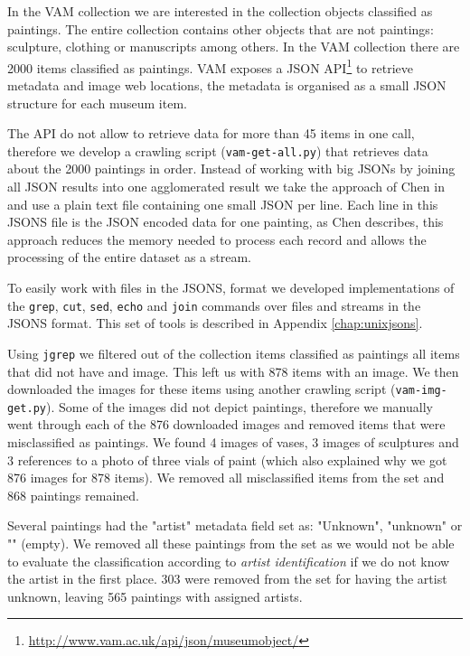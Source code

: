 \documentclass[11pt,a4paper,twoside,openright]{report}
\begin{document}
In the VAM collection we are interested in the collection objects classified as
paintings.  The entire collection contains other objects that are not
paintings: sculpture, clothing or manuscripts among others.  In the VAM
collection there are 2000 items classified as paintings.  VAM exposes a JSON
API\footnote{\href{http://www.vam.ac.uk/api/json/museumobject/}
{http://www.vam.ac.uk/api/json/museumobject/}} to retrieve metadata and image
web locations, the metadata is organised as a small JSON structure for each
museum item.

The API do not allow to retrieve data for more than 45 items in one call,
therefore we develop a crawling script (\texttt{vam-get-all.py}) that retrieves
data about the 2000 paintings in order.  Instead of working with big JSONs by
joining all JSON results into one agglomerated result we take the approach of
Chen in \cite{chen09yahoo} and use a plain text file containing one small JSON
per line.  Each line in this JSONS file is the JSON encoded data for one
painting, as Chen \cite{chen09yahoo} describes, this approach reduces the
memory needed to process each record and allows the processing of the entire
dataset as a stream.

To easily work with files in the JSONS, format we developed implementations of
the \texttt{grep}, \texttt{cut}, \texttt{sed}, \texttt{echo} and \texttt{join}
commands over files and streams in the JSONS format.  This set of tools is
described in Appendix \ref{chap:unixjsons}.

Using \texttt{jgrep} we filtered out of the collection items classified as
paintings all items that did not have and image.  This left us with 878 items
with an image.  We then downloaded the images for these items using another
crawling script (\texttt{vam-img-get.py}).  Some of the images did not depict
paintings, therefore we manually went through each of the 876 downloaded images
and removed items that were misclassified as paintings.  We found 4 images of
vases, 3 images of sculptures and 3 references to a photo of three vials of
paint (which also explained why we got 876 images for 878 items).  We removed
all misclassified items from the set and 868 paintings remained.

Several paintings had the "artist" metadata field set as: "Unknown", "unknown"
or "" (empty).  We removed all these paintings from the set as we would not be
able to evaluate the classification according to \emph{artist identification}
if we do not know the artist in the first place.  303 were removed from the set
for having the artist unknown, leaving 565 paintings with assigned artists.
\end{document}
